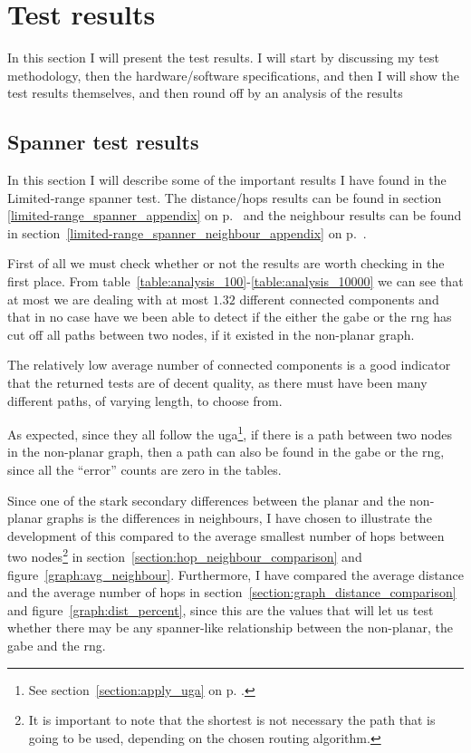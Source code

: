 \section{Test results}
\label{section:test_results}
In this section I will present the test results. I will start by discussing my test methodology, then the hardware/software specifications, and then I will show the test results themselves, and then round off by an analysis of the results 

\subsection{Spanner test results}
In this section I will  describe some of the important results I have found in the Limited-range spanner test. The distance/hops results can be found in section \ref{limited-range_spanner_appendix} on p.~\pageref{limited-range_spanner_appendix} and the neighbour results can be found in section~\ref{limited-range_spanner_neighbour_appendix} on p.~\pageref{limited-range_spanner_neighbour_appendix}.

First of all we must check whether or not the results are worth checking in the first place. From table~\ref{table:analysis_100}-\ref{table:analysis_10000} we can see that at most we are dealing with at most $1.32$ different connected components and that in no case have we been able to detect if the either the \ac{gabe} or the \ac{rng} has cut off all paths between two nodes, if it existed in the non-planar graph. 

The relatively low average number of connected components is a good indicator that the returned tests are of decent quality, as there must have been many different paths, of varying length, to choose from.

As expected, since they all follow the \ac{uga}\footnote{See section~\ref{section:apply_uga} on p. \pageref{section:apply_uga}.}, if there is a path between two nodes in the non-planar graph, then a path can also be found in the \ac{gabe} or the \ac{rng}, since all the ``error'' counts are zero in the tables.

Since one of the stark secondary differences between the planar and the non-planar graphs is the differences in neighbours, I have chosen to illustrate the development of this compared to the average smallest number of hops between two nodes\footnote{It is important to note that the shortest is not necessary the path that is going to be used, depending on the chosen routing algorithm.} in section~\ref{section:hop_neighbour_comparison} and figure~\ref{graph:avg_neighbour}. Furthermore, I have compared the average distance and the average number of hops in section~\ref{section:graph_distance_comparison} and figure~\ref{graph:dist_percent}, since this are the values that will let us test whether there may be any spanner-like relationship between the non-planar, the \ac{gabe} and the \ac{rng}.

